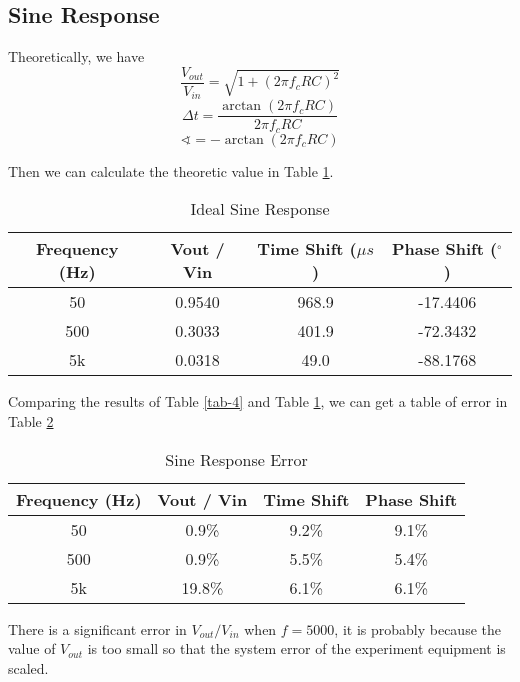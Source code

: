 \documentclass{article}
\begin{document}

\subsection{Sine Response}

Theoretically, we have
$$\frac{V_{out}}{V_{in}}=\sqrt{1+(2\pi f_cRC)^2}$$
$$\Delta t=\frac{\arctan(2\pi f_cRC)}{2\pi f_cRC}$$
$$\sphericalangle=-\arctan(2\pi f_cRC)$$

Then we can calculate the theoretic value in Table \ref{tab-4-ideal}.

\begin{table}[htbp]
	\centering
	\begin{tabular}{|c|c|c|c|}
		\hline
		Frequency (Hz) & Vout / Vin & Time Shift ($\mu s$) & Phase Shift ($^\circ$) \\
		\hline
		50 & 0.9540 & 968.9 & -17.4406 \\
		\hline
		500 & 0.3033 & 401.9 & -72.3432 \\
		\hline
		5k & 0.0318& 49.0 & -88.1768\\
		\hline
	\end{tabular}
	\caption{Ideal Sine Response}
	\label{tab-4-ideal}
\end{table}

Comparing the results of Table \ref{tab-4} and Table \ref{tab-4-ideal}, we can get a table of error in Table \ref{tab-4-error}

\begin{table}[htbp]
	\centering
	\begin{tabular}{|c|c|c|c|}
		\hline
		Frequency (Hz) & Vout / Vin & Time Shift & Phase Shift  \\
		\hline
		50 & 0.9\% & 9.2\% & 9.1\% \\
		\hline
		500 & 0.9\% & 5.5\% & 5.4\% \\
		\hline
		5k & 19.8\% & 6.1\% & 6.1\% \\
		\hline
	\end{tabular}
	\caption{Sine Response Error}
	\label{tab-4-error}
\end{table}

There is a significant error in $V_{out} / V_{in}$ when $f=5000$, it is probably because the value of $V_{out}$ is too small so that the system error of the experiment equipment is scaled.
\end{document}
